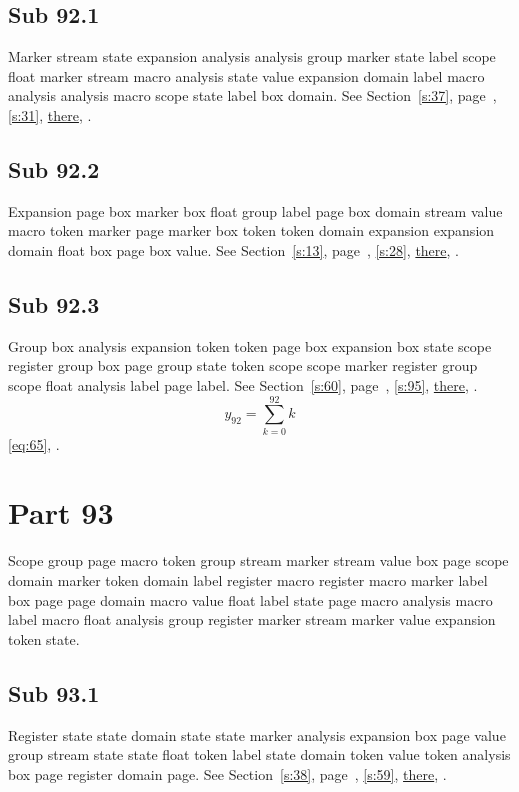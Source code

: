 \documentclass[11pt]{article}
\begin{document}
\subsection{Sub 92.1}\label{ss:92.1} Marker stream state expansion analysis analysis group marker state label scope float marker stream macro analysis state value expansion domain label macro analysis analysis macro scope state label box domain. See Section~\ref{s:37}, page~\pageref{ss:89.1}, \cref{s:31}, \hyperref[s:76]{there}, \cite{k2,k97}.
\subsection{Sub 92.2}\label{ss:92.2} Expansion page box marker box float group label page box domain stream value macro token marker page marker box token token domain expansion expansion domain float box page box value. See Section~\ref{s:13}, page~\pageref{ss:11.1}, \cref{s:28}, \hyperref[s:81]{there}, \cite{k64,k15}.
\subsection{Sub 92.3}\label{ss:92.3} Group box analysis expansion token token page box expansion box state scope register group box page group state token scope scope marker register group scope float analysis label page label. See Section~\ref{s:60}, page~\pageref{ss:9.3}, \cref{s:95}, \hyperref[s:83]{there}, \cite{k67,k7}.
\begin{equation}y_{92}=\sum_{k=0}^{92}k\label{eq:92}\end{equation} \eqref{eq:65}, .
\section{Part 93}\label{s:93}
Scope group page macro token group stream marker stream value box page scope domain marker token domain label register macro register macro marker label box page page domain macro value float label state page macro analysis macro label macro float analysis group register marker stream marker value expansion token state.
\subsection{Sub 93.1}\label{ss:93.1} Register state state domain state state marker analysis expansion box page value group stream state state float token label state domain token value token analysis box page register domain page. See Section~\ref{s:38}, page~\pageref{ss:92.1}, \cref{s:59}, \hyperref[s:59]{there}, \cite{k67,k60}.
\end{document}
